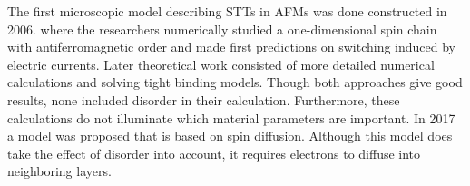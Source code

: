 The first microscopic model describing STTs in AFMs was done constructed in 2006. where
the researchers numerically studied a one-dimensional spin chain with antiferromagnetic
order and made first predictions on switching induced by electric currents. Later
theoretical work consisted of more detailed numerical calculations and solving tight binding
models. Though both approaches give good results, none included disorder in their
calculation. Furthermore, these calculations do not illuminate which material
parameters are important. In 2017 a model was proposed that is based on spin
diffusion. Although this model does take the effect of disorder into account, it requires
electrons to diffuse into neighboring layers. 

\
